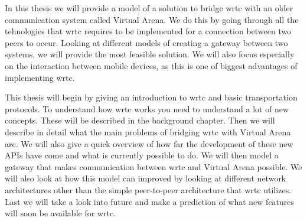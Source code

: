 In this thesis we will provide a model of a solution to bridge \gls{wrtc} with an older communication system called Virtual Arena. We do this by going through all the tehnologies that \gls{wrtc} requires to be implemented for a connection between two peers to occur. Looking at different models of creating a gateway between two systems, we will provide the most feasible solution. We will also focus especially on the interaction between mobile devices, as this is one of biggest advantages of implementing \gls{wrtc}.

This thesis will begin by giving an introduction to \gls{wrtc} and basic transportation protocols. To understand how \gls{wrtc} works you need to understand a lot of new concepts. These will be described in the background chapter. Then we will describe in detail what the main problems of bridging \gls{wrtc} with Virtual Arena are. We will also give a quick overview of how far the development of these new APIs have come and what is currently possible to do. We will then model a gateway that makes communication between \gls{wrtc} and Virtual Arena possible. We will also look at how this model can improved by looking at different network architectures other than the simple peer-to-peer architecture that \gls{wrtc} utilizes. Last we will take a look into future and make a prediction of what new features will soon be available for \gls{wrtc}.
